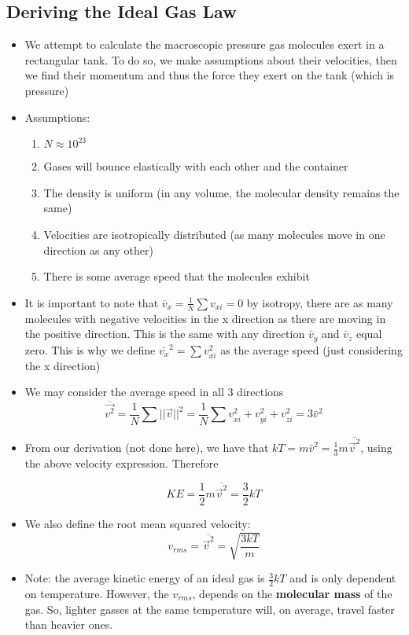 \documentclass[8pt]{article}
\begin{document}
\subsection{Deriving the Ideal Gas Law}
\begin{itemize}
    \item We attempt to calculate the macroscopic pressure gas molecules exert in a rectangular tank. To do so, we make assumptions about their velocities, then we find their momentum and thus the force they exert on the tank (which is pressure)
    \item Assumptions:
    \begin{enumerate}
        \item $N \approx 10^{23}$
        \item Gases will bounce elastically with each other and the container 
        \item The density is uniform (in any volume, the molecular density remains the same)
        \item Velocities are isotropically distributed (as many molecules move in one direction as any other) 
        \item There is some average speed that the molecules exhibit
    \end{enumerate}
    \item It is important to note that $\overline{v}_x = \frac{1}{N} \sum v_{xi} = 0$ by isotropy, there are as many molecules with negative velocities in the x direction as there are moving in the positive direction. This is the same with any direction $\bar{v}_y$ and $\bar{v}_z$  equal zero. This is why we define $\bar{v_x}^2 = \sum v^2_{xi}$ as the average speed (just considering the x direction)
    \item  We may consider the average speed in all 3 directions \[\overline{\vec{v^2}} = \frac{1}{N} \sum ||\vec{v}||^2 = \frac{1}{N} \sum v^2_{xi}+ v^2_{yi}+ v^2_{zi} = 3 \bar{v}^2\]
    \item From our derivation (not done here), we have that $kT = m\bar{v}^2 = \frac{1}{3}m\bar{\vec{v}^2}$, using the above velocity expression. Therefore 
    
    \begin{equation}
        KE = \frac{1}{2} m\overline{\vec{v}^2} = \frac{3}{2}kT
    \end{equation}
    
    \item We also define the root mean squared velocity: 
    \begin{equation}
        v_{rms}={\overline{\vec{v}^2}} = \sqrt{\frac{3kT}{m}}
\end{equation}
\item Note: the average kinetic energy of an ideal gas is $\frac{3}{2}kT$ and is only dependent on temperature. However, the $v_{rms}$, depends on the \textbf{molecular mass} of the gas. So, lighter gasses at the same temperature will, on average, travel faster than heavier ones.
\end{itemize}
\\ 
\end{document}

